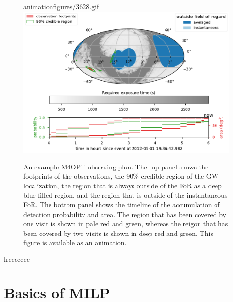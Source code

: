 \documentclass[twocolumn,times]{aastex631}
\begin{document}
\begin{figure}
    \begin{interactive}{animation}{figures/3628.gif}
        \includegraphics{figures/3628}
    \end{interactive}
    \caption{\label{fig:example}An example \ac{M4OPT} observing plan. The top panel shows the footprints of the observations, the 90\% credible region of the \ac{GW} localization, the region that is always outside of the \ac{FoR} as a deep blue filled region, and the region that is outside of the instantaneous \ac{FoR}. The bottom panel shows the timeline of the accumulation of detection probability and area. The region that has been covered by one visit is shown in pale red and green, whereas the reigon that has been covered by two visits is shown in deep red and green. This figure is available as an animation.}
\end{figure}

\begin{deluxetable*}{lrccccccc}
    \startdata
    
    \enddata
\end{deluxetable*}

\section{Basics of \ac{MILP}}
\end{document}
